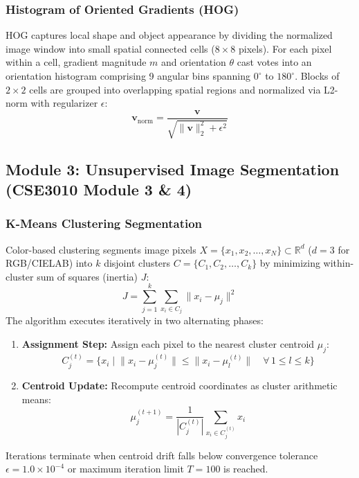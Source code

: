 \subsubsection{Histogram of Oriented Gradients (HOG)}
HOG captures local shape and object appearance by dividing the normalized image window into small spatial connected cells ($8\times8$ pixels). For each pixel within a cell, gradient magnitude $m$ and orientation $\theta$ cast votes into an orientation histogram comprising 9 angular bins spanning $0^\circ$ to $180^\circ$. Blocks of $2\times2$ cells are grouped into overlapping spatial regions and normalized via L2-norm with regularizer $\epsilon$:
\begin{equation}
    \mathbf{v}_{\text{norm}} = \frac{\mathbf{v}}{\sqrt{\|\mathbf{v}\|_2^2 + \epsilon^2}}
\end{equation}

\subsection{Module 3: Unsupervised Image Segmentation (CSE3010 Module 3 \& 4)}

\subsubsection{K-Means Clustering Segmentation}
Color-based clustering segments image pixels $X = \{x_1, x_2, \dots, x_N\} \subset \mathbb{R}^d$ ($d=3$ for RGB/CIELAB) into $k$ disjoint clusters $C = \{C_1, C_2, \dots, C_k\}$ by minimizing within-cluster sum of squares (inertia) $J$:
\begin{equation}
    J = \sum_{j=1}^k \sum_{x_i \in C_j} \|x_i - \mu_j\|^2
\end{equation}
The algorithm executes iteratively in two alternating phases:
\begin{enumerate}
    \item \textbf{Assignment Step:} Assign each pixel to the nearest cluster centroid $\mu_j$:
    \begin{equation}
        C_j^{(t)} = \Big\{ x_i \;\Big|\; \|x_i - \mu_j^{(t)}\| \le \|x_i - \mu_l^{(t)}\| \quad \forall\, 1 \le l \le k \Big\}
    \end{equation}
    \item \textbf{Centroid Update:} Recompute centroid coordinates as cluster arithmetic means:
    \begin{equation}
        \mu_j^{(t+1)} = \frac{1}{|C_j^{(t)}|} \sum_{x_i \in C_j^{(t)}} x_i
    \end{equation}
\end{enumerate}
Iterations terminate when centroid drift falls below convergence tolerance $\epsilon = 1.0 \times 10^{-4}$ or maximum iteration limit $T = 100$ is reached.

